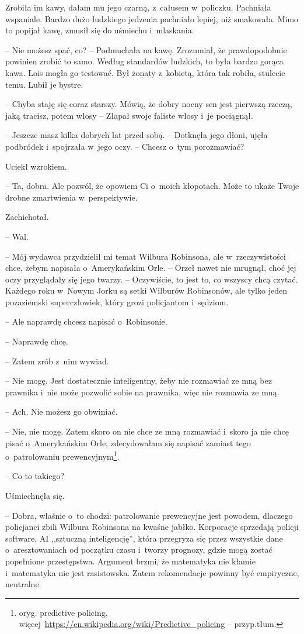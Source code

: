 \documentclass[oneside,polish,11pt,sfheadings]{mwbk}
\begin{document}
Zrobiła im kawy, dałam mu jego czarną, z~całusem w~policzku. Pachniała
wspaniale. Bardzo dużo ludzkiego jedzenia pachniało lepiej, niż
smakowała. Mimo to popijał kawę, zmusił się do uśmiechu i~mlaskania.

-- Nie możesz spać, co? -- Podmuchała na kawę. Zrozumiał, że
prawdopodobnie powinien zrobić to samo. Według standardów ludzkich, to
była bardzo gorąca kawa. Lois mogła go testować. Był żonaty z~kobietą,
która tak robiła, stulecie temu. Lubił je bystre.

-- Chyba staję się coraz starszy. Mówią, że dobry nocny sen jest pierwszą
rzeczą, jaką tracisz, potem włosy -- Złapał swoje faliste włosy i~je
pociągnął.

-- Jeszcze masz kilka dobrych lat przed sobą. -- Dotknęła jego dłoni,
ujęła podbródek i~spojrzała w~jego oczy. -- Chcesz o~tym porozmawiać?

Uciekł wzrokiem.

-- Ta, dobra. Ale pozwól, że opowiem Ci o~moich kłopotach. Może to ukaże
Twoje drobne zmartwienia w~perspektywie.

Zachichotał. 

-- Wal.

-- Mój wydawca przydzielił mi temat Wilbura Robinsona, ale w~rzeczywistości chce, żebym napisała o~Amerykańskim Orle. -- Orzeł nawet
nie mrugnął, choć jej oczy przyglądały się jego twarzy. -- Oczywiście, to
jest to, co wszyscy chcą czytać. Każdego roku w~Nowym Jorku są setki
Wilburów Robinsonów, ale tylko jeden pozaziemski superczłowiek, który
grozi policjantom i~sędziom.

-- Ale naprawdę chcesz napisać o~Robinsonie.

-- Naprawdę chcę.

-- Zatem zrób z~nim wywiad.

-- Nie mogę. Jest dostatecznie inteligentny, żeby nie rozmawiać ze mną
bez prawnika i~nie może pozwolić sobie na prawnika, więc nie rozmawia ze
mną.

-- Ach. Nie możesz go obwiniać.

-- Nie, nie mogę. Zatem skoro on nie chce ze mną rozmawiać i~skoro ja nie
chcę pisać o~Amerykańskim Orle, zdecydowałam się napisać zamiast tego o~patrolowaniu prewencyjnym\footnote{ oryg. predictive policing,
więcej~\url{https://en.wikipedia.org/wiki/Predictive\_policing}
-- przyp.tłum.}.

-- Co to takiego?

Uśmiechnęła się. 

-- Dobra, właśnie o~to chodzi: patrolowanie prewencyjne
jest powodem, dlaczego policjanci zbili Wilbura Robinsona na kwaśne
jabłko. Korporacje sprzedają policji software, AI ,,sztuczną
inteligencję'', która przegryza się przez wszystkie dane o~aresztowaniach od początku czasu i~tworzy prognozy, gdzie mogą zostać
popełnione przestępstwa. Argument brzmi, że matematyka nie kłamie i~matematyka nie jest rasistowska. Zatem rekomendacje powinny być
empiryczne, neutralne.
\end{document}
